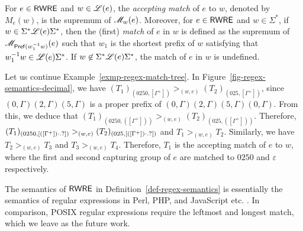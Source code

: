 \begin{definition}
  	For $e \in {\sf RWRE}$ and $w \in \mathscr{L}(e)$, the \emph{accepting match} of $e$ to $w$, denoted by $M_e(w)$, is the supremum of $\mathscr{M}_w(e)$. Moreover,  for $e \in {\sf RWRE}$ and $w \in \Sigma^\ast$, if $w \in \Sigma^\ast \mathscr{L}(e)\Sigma^\ast$, then the (first) \emph{match} of $e$ in $w$ is defined as the supremum of $\mathscr{M}_{\mathsf{Pref}(w_1^{-1}w)}(e)$ such that $w_1$ is the shortest prefix of $w$ satisfying that $w_1^{-1}w \in \mathscr{L}(e)\Sigma^\ast$. If $w \not \in \Sigma^\ast \mathscr{L}(e)\Sigma^\ast$, the match of $e$ in $w$ is undefined.  
%  	
  \end{definition}

\begin{example}\label{exmp-regex-semantics}
Let us continue Example~\ref{exmp-regex-match-tree}.  In Figure~\ref{fig-regex-semantics-decimal}, we have $(T_1)_{(0250, [\Gamma^+])} >_{(w, e)} (T_2)_{(025, [\Gamma^+])}$, since $(0, \Gamma)(2, \Gamma)(5,\Gamma)$ is a proper prefix of $(0, \Gamma)(2, \Gamma)(5,\Gamma)(0, \Gamma)$. From this, we deduce that $(T_1)_{(0250, ([\Gamma^+]))} >_{(w, e)} (T_2)_{(025, ([\Gamma^+]))}$. Therefore, $(T_1)_{(0250, [([\Gamma^+]) \cdot .?])} >_{(w, e)} (T_2)_{(025,  [([\Gamma^+]) \cdot .?])}$ and $T_1 >_{(w,e)} T_2$. Similarly, we have $T_2 >_{(w,e)} T_3$ and $T_3 >_{(w,e)} T_4$. Therefore, $T_1$ is the accepting match of $e$ to $w$, where the first and second capturing group of $e$ are matched to $0250$  and $\varepsilon$ respectively. 
 \end{example}
  
\begin{remark}
The semantics of ${\sf RWRE}$ in Definition~\ref{def-regex-semantics} is essentially the semantics of regular expressions in Perl, PHP, and JavaScript etc. \cite{MasterREbook}. In comparison, POSIX regular expressions require the leftmost and longest match, which we leave as the future work. 
\end{remark}
  
  
  
%  
